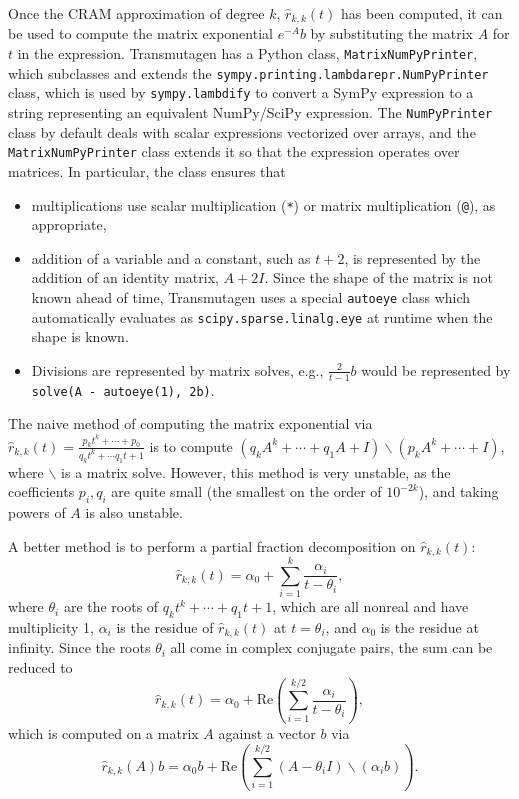 Once the CRAM approximation of degree $k$, $\hat{r}_{k, k}(t)$ has been
computed, it can be used to compute the matrix exponential $e^{-A}b$ by
substituting the matrix $A$ for $t$ in the expression. Transmutagen has a
Python class, \texttt{MatrixNumPyPrinter}, which subclasses and extends the
\texttt{sympy.printing.lambdarepr.NumPyPrinter} class, which is used by
\texttt{sympy.lambdify} to convert a SymPy expression to a string representing
an equivalent NumPy/SciPy expression. The \texttt{NumPyPrinter} class by
default deals with scalar expressions vectorized over arrays, and the
\texttt{MatrixNumPyPrinter} class extends it so that the expression operates
over matrices. In particular, the class ensures that

\begin{itemize}
\item multiplications use scalar multiplication (\texttt{*}) or
  matrix multiplication (\texttt{@}), as appropriate,
\item addition of a variable and a constant, such as $t + 2$, is represented
  by the addition of an identity matrix, $A + 2I$. Since the shape of the
  matrix is not known ahead of time, Transmutagen uses a special
  \texttt{autoeye} class which automatically evaluates as \texttt{scipy.sparse.linalg.eye} at runtime when the shape is known.
\item Divisions are represented by matrix solves, e.g., $\frac{2}{t - 1}b$
  would be represented by \texttt{solve(A - autoeye(1), 2b)}.
\end{itemize}

The naive method of computing the matrix exponential via $\hat{r}_{k,
  k}(t)=\frac{p_kt^k + \cdots + p_0}{q_kt^k + \cdots q_1t + 1}$
is to compute $(q_kA^k + \cdots + q_1A + I)\backslash(p_kA^k + \cdots + I)$, where
$\backslash$ is a matrix solve. However, this method is very unstable, as the
coefficients $p_i,q_i$ are quite small (the smallest on the order of
$10^{-2k}$), and taking powers of $A$ is also unstable.

A better method is to perform a partial fraction decomposition on $\hat{r}_{k,
  k}(t)$:
\begin{equation}
  \hat{r}_{k, k}(t) = \alpha_0 + \sum_{i=1}^k \frac{\alpha_i}{t - \theta_i},
\end{equation}
where $\theta_i$ are the roots of $q_kt^k + \cdots + q_1t + 1$, which are all
nonreal and have multiplicity 1, $\alpha_i$ is the residue of $\hat{r}_{k,
  k}(t)$ at $t=\theta_i$, and $\alpha_0$ is the residue at infinity. Since the
roots $\theta_i$ all come in complex conjugate pairs, the sum can be reduced to
\begin{equation}
  \hat{r}_{k, k}(t) = \alpha_0 + \mathrm{Re}\left(\sum_{i=1}^{k/2} \frac{\alpha_i}{t - \theta_i}\right),
\end{equation}
which is computed on a matrix $A$ against a vector $b$ via
\begin{equation}
  \hat{r}_{k, k}(A)b = \alpha_0b + \mathrm{Re}\left(\sum_{i=1}^{k/2} (A -
    \theta_i I)\backslash(\alpha_i b) \right).
\end{equation}

